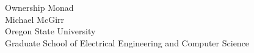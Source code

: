 \documentclass[10pt]{article}
\begin{document}
\vspace{2.0cm}

\begin{center}
    {\huge Ownership Monad }  %
    \vspace{0.4cm} \\
    {\large Michael McGirr}
    \vspace{0.1cm} \\
    {\large Oregon State University}
    \vspace{0.1cm} \\
    {\large Graduate School of Electrical Engineering and Computer Science}
    \vspace{0.4cm} \\
\end{center}

\vspace{1.0cm}
\end{document}
